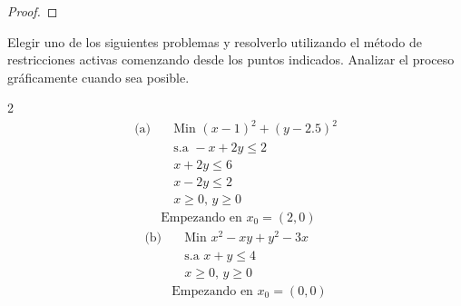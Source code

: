 \documentclass{article}
\newenvironment{theorem}[2][Ejercicio]{\begin{trivlist}
\item[\hskip \labelsep {\bfseries #1}\hskip \labelsep {\bfseries #2.}]}{\end{trivlist}}
\begin{document}
\begin{proof}

\end{proof}

\begin{theorem}{4}
    Elegir uno de los siguientes problemas y resolverlo utilizando el método de restricciones activas comenzando desde los puntos indicados. Analizar el proceso gráficamente cuando sea posible.
    \begin{multicols}{2}
        \noindent
        \begin{align*}
            \text{(a)} & \quad \text{Min } {(x - 1)}^2 + {(y - 2.5)}^2 \\
                       & \quad \text{s.a } -x + 2y \leq 2              \\
                       & \quad x + 2y \leq 6                           \\
                       & \quad x - 2y \leq 2                           \\
                       & \quad x \geq 0, \, y \geq 0                   \\
                       & \text{Empezando en } x_0 = (2, 0)
        \end{align*}
        \columnbreak
        \begin{align*}
            \text{(b)} & \quad \text{Min } x^2 - xy + y^2 - 3x \\
                       & \quad \text{s.a } x + y \leq 4        \\
                       & \quad x \geq 0, \, y \geq 0           \\
                       & \text{Empezando en } x_0 = (0, 0)
        \end{align*}
    \end{multicols}
\end{theorem}
\end{document}
